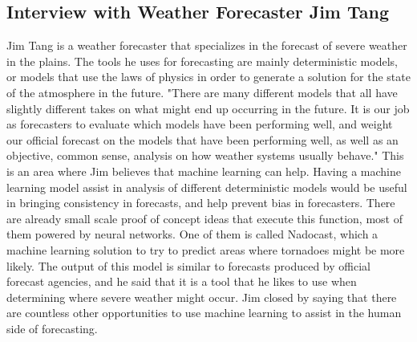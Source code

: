 \documentclass[10pt]{article}
\begin{document}
\subsection*{Interview with Weather Forecaster Jim Tang}
Jim Tang is a weather forecaster that specializes in the forecast of severe weather in the plains. The tools he uses for forecasting are mainly deterministic models, or models that use the laws of physics in order to generate a solution for the state of the atmosphere in the future. "There are many different models that all have slightly different takes on what might end up occurring in the future. It is our job as forecasters to evaluate which models have been performing well, and weight our official forecast on the models that have been performing well, as well as an objective, common sense, analysis on how weather systems usually behave." This is an area where Jim believes that machine learning can help. Having a machine learning model assist in analysis of different deterministic models would be useful in bringing consistency in forecasts, and help prevent bias in forecasters. There are already small scale proof of concept ideas that execute this function, most of them powered by neural networks. One of them is called Nadocast, which a machine learning solution to try to predict areas where tornadoes might be more likely. The output of this model is similar to forecasts produced by official forecast agencies, and he said that it is a tool that he likes to use when determining where severe weather might occur. Jim closed by saying that there are countless other opportunities to use machine learning to assist in the human side of forecasting.
\end{document}
